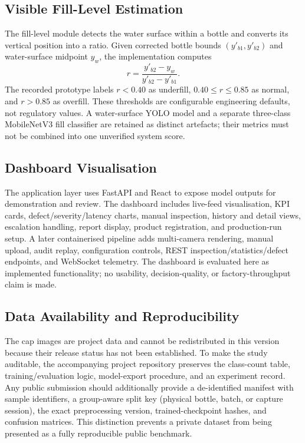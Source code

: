 \documentclass[conference]{../IEEE_paper/IEEEtran}
\begin{document}
\subsection{Visible Fill-Level Estimation}
The fill-level module detects the water surface within a bottle and converts its vertical position into a ratio. Given corrected bottle bounds $(y'_{b1},y'_{b2})$ and water-surface midpoint $y_w$, the implementation computes
\begin{equation}r=\frac{y'_{b2}-y_w}{y'_{b2}-y'_{b1}}.\end{equation}
The recorded prototype labels $r<0.40$ as underfill, $0.40\leq r\leq0.85$ as normal, and $r>0.85$ as overfill. These thresholds are configurable engineering defaults, not regulatory values. A water-surface YOLO model and a separate three-class MobileNetV3 fill classifier are retained as distinct artefacts; their metrics must not be combined into one unverified system score.

\subsection{Dashboard Visualisation}
The application layer uses FastAPI and React to expose model outputs for demonstration and review. The dashboard includes live-feed visualisation, KPI cards, defect/severity/latency charts, manual inspection, history and detail views, escalation handling, report display, product registration, and production-run setup. A later containerised pipeline adds multi-camera rendering, manual upload, audit replay, configuration controls, REST inspection/statistics/defect endpoints, and WebSocket telemetry. The dashboard is evaluated here as implemented functionality; no usability, decision-quality, or factory-throughput claim is made.

\subsection{Data Availability and Reproducibility}
The cap images are project data and cannot be redistributed in this version because their release status has not been established. To make the study auditable, the accompanying project repository preserves the class-count table, training/evaluation logic, model-export procedure, and an experiment record. Any public submission should additionally provide a de-identified manifest with sample identifiers, a group-aware split key (physical bottle, batch, or capture session), the exact preprocessing version, trained-checkpoint hashes, and confusion matrices. This distinction prevents a private dataset from being presented as a fully reproducible public benchmark.
\end{document}
